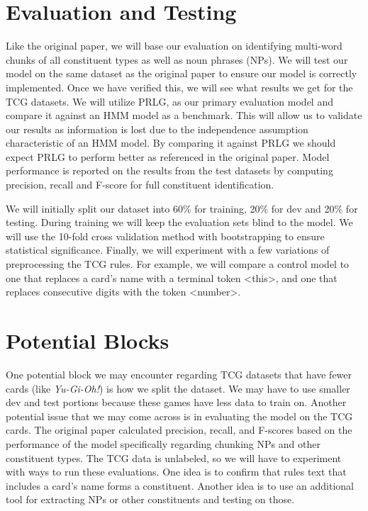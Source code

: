\documentclass[11pt,a4paper]{article}
\begin{document}
\section{Evaluation and Testing}

Like the original paper, we will base our evaluation on identifying multi-word chunks of all constituent types as well as noun phrases (NPs).
We will test our model on the same dataset as the original paper to ensure our model is correctly implemented.
Once we have verified this, we will see what results we get for the TCG datasets.
We will utilize PRLG, as our primary evaluation model and compare it against an HMM model as a benchmark.
This will allow us to validate our results as information is lost due to the independence assumption characteristic of an HMM model.
By comparing it against PRLG we should expect PRLG to perform better as referenced in the original paper.
Model performance is reported on the results from the test datasets by computing precision, recall and F-score for full constituent identification.

We will initially split our dataset into 60\% for training, 20\% for dev and 20\% for testing.
During training we will keep the evaluation sets blind to the model.
We will use the 10-fold cross validation method with bootstrapping to ensure statistical significance.
Finally, we will experiment with a few variations of preprocessing the TCG rules.
For example, we will compare a control model to one that replaces a card’s name with a terminal token \textless this\textgreater, and one that replaces consecutive digits with the token \textless number\textgreater.

\section{Potential Blocks}

One potential block we may encounter regarding TCG datasets that have fewer cards (like \emph{Yu-Gi-Oh!}) is how we split the dataset.
We may have to use smaller dev and test portions because these games have less data to train on.
Another potential issue that we may come across is in evaluating the model on the TCG cards.
The original paper calculated precision, recall, and F-scores based on the performance of the model specifically regarding chunking NPs and other constituent types.
The TCG data is unlabeled, so we will have to experiment with ways to run these evaluations.
One idea is to confirm that rules text that includes a card’s name forms a constituent.
Another idea is to use an additional tool for extracting NPs or other constituents and testing on those.



\end{document}
